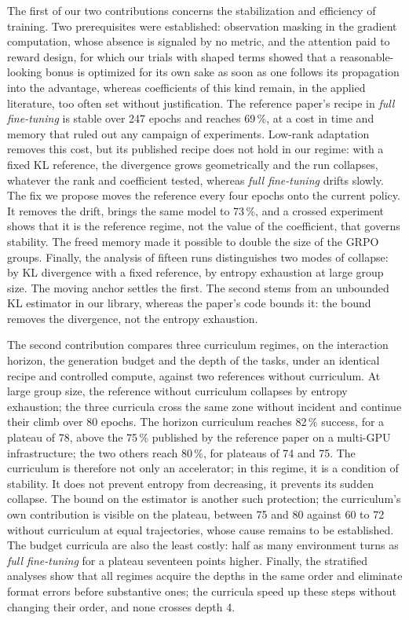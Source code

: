 \documentclass[11pt,a4paper]{article}
\begin{document}
The first of our two contributions concerns the stabilization and efficiency of training. Two prerequisites were established: observation masking in the gradient computation, whose absence is signaled by no metric, and the attention paid to reward design, for which our trials with shaped terms showed that a reasonable-looking bonus is optimized for its own sake as soon as one follows its propagation into the advantage, whereas coefficients of this kind remain, in the applied literature, too often set without justification. The reference paper's recipe in \emph{full fine-tuning} is stable over 247 epochs and reaches 69\,\%, at a cost in time and memory that ruled out any campaign of experiments. Low-rank adaptation removes this cost, but its published recipe does not hold in our regime: with a fixed KL reference, the divergence grows geometrically and the run collapses, whatever the rank and coefficient tested, whereas \emph{full fine-tuning} drifts slowly. The fix we propose moves the reference every four epochs onto the current policy. It removes the drift, brings the same model to 73\,\%, and a crossed experiment shows that it is the reference regime, not the value of the coefficient, that governs stability. The freed memory made it possible to double the size of the GRPO groups. Finally, the analysis of fifteen runs distinguishes two modes of collapse: by KL divergence with a fixed reference, by entropy exhaustion at large group size. The moving anchor settles the first. The second stems from an unbounded KL estimator in our library, whereas the paper's code bounds it: the bound removes the divergence, not the entropy exhaustion.

The second contribution compares three curriculum regimes, on the interaction horizon, the generation budget and the depth of the tasks, under an identical recipe and controlled compute, against two references without curriculum. At large group size, the reference without curriculum collapses by entropy exhaustion; the three curricula cross the same zone without incident and continue their climb over 80 epochs. The horizon curriculum reaches 82\,\% success, for a plateau of 78, above the 75\,\% published by the reference paper on a multi-GPU infrastructure; the two others reach 80\,\%, for plateaus of 74 and 75. The curriculum is therefore not only an accelerator; in this regime, it is a condition of stability. It does not prevent entropy from decreasing, it prevents its sudden collapse. The bound on the estimator is another such protection; the curriculum's own contribution is visible on the plateau, between 75 and 80 against 60 to 72 without curriculum at equal trajectories, whose cause remains to be established. The budget curricula are also the least costly: half as many environment turns as \emph{full fine-tuning} for a plateau seventeen points higher. Finally, the stratified analyses show that all regimes acquire the depths in the same order and eliminate format errors before substantive ones; the curricula speed up these steps without changing their order, and none crosses depth 4.
\end{document}
